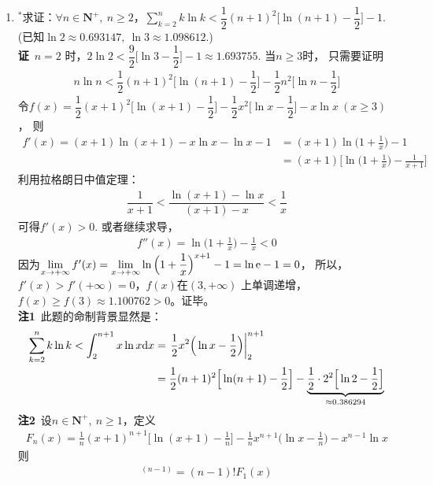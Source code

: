 \begin{enumerate}[label={【\textbf{例\thechapter.\arabic*}】},
 leftmargin=\inteval{\myenumleftmargin}pt,
 itemsep=\inteval{\myenumitempsep}pt,
 itemindent=\inteval{\myenumitemindent}pt]
\item $ ^* $求证：$ \forall n\in \textbf{N}^+,\ n\geq 2 $，$ \sum\limits_{k=2}^{n} 
k\ln k<\dfrac{1}{2}(n+1)^2\Big[\ln(n+1)-\dfrac{1}{2} \Big]-1 $. \\
(已知$ \ln 2\approx 0.693147,\ \ln 3\approx 1.098612 $.) \\
\textbf{证}\ $ n=2 $ 时，$ 2\ln 2<\dfrac{9}{2}\Big[\ln 3-
\dfrac{1}{2}\Big]-1\approx 1.693755 $. 当$ n\geq 3 $时，
只需要证明
\begin{gather*}
    n\ln n<\dfrac{1}{2}(n+1)^2\Big[\ln(n+1)-\dfrac{1}{2} 
    \Big]-\dfrac{1}{2}n^2\Big[\ln n-\dfrac{1}{2} \Big] 
\end{gather*}
令$ f(x)=\dfrac{1}{2}(x+1)^2\Big[\ln(x+1)-\dfrac{1}{2} 
\Big]-\dfrac{1}{2}x^2\Big[\ln x-\dfrac{1}{2} \Big]-x\ln x\ 
(x\geq 3) $，
则
\begin{align*}
    f'(x) =(x+1)\ln(x+1)-x\ln x-\ln x-1 &=
    (x+1)\ln\Big(1+\frac{1}{x}\Big)-1\\
    &=(x+1)\Big[\ln\Big(1+\frac{1}{x}\Big)-\frac{1}{x+1}\Big]
\end{align*}
利用拉格朗日中值定理：
\begin{gather*}
    \dfrac{1}{x+1}<\dfrac{\ln(x+1)-\ln x}{(x+1)-x}<\dfrac{1}{x}
\end{gather*}
可得$ f'(x)>0 $. 或者继续求导，
\begin{align*}
    f''(x)=\ln\Big(1+\frac{1}{x}\Big)-\frac{1}{x}<0
\end{align*}
因为$ \lim\limits_{x\to+\infty}f'(x)=\lim\limits_{x\to+\infty}
\ln\Big(1+\dfrac{1}{x}\Big)^{x+1}-1=\ln \mathrm{e}-1=0 $，
所以，$ f'(x)>f'(+\infty)=0 $，$ f(x) $在$ (3,+\infty) $
上单调递增，$ f(x)\geq f(3)\approx 1.100762>0 $。证毕。\\
\textbf{注1}\ 此题的命制背景显然是：
\begin{align*}
    \sum\limits_{k=2}^{n} k\ln k<\int_2^{n+1}x\ln x\mathrm{d} x &=
    \left.\dfrac{1}{2}x^2\Big(\ln x-\dfrac{1}{2}\Big)\right|_2^{n+1} \\
    &=\dfrac{1}{2}(n+1)^2\Big[\ln(n+1)-\dfrac{1}{2} \Big]
    -\underbrace{\dfrac{1}{2}\cdot2^2\Big[\ln 2-\dfrac{1}{2} 
        \Big]}_{\approx 0.386294 }
\end{align*}
\textbf{注2}\ 设$  n\in \textbf{N}^+,\ n\geq 1 $，定义
\begin{gather*}
    F_n(x)=\frac{1}{n}(x+1)^{n+1}\Big[\ln (x+1)-\frac{1}{n}\Big]
    -\frac{1}{n}x^{n+1}\Big(\ln x-\frac{1}{n}\Big)-x^{n-1}\ln x
\end{gather*}
则
\begin{gather*}
    [F_n(x)]^{(n-1)}=(n-1)!F_1(x)

\end{gather*}
\end{enumerate}
